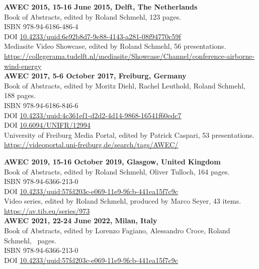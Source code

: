 \begin{multicols*}{2}
{\bfseries AWEC 2015, 15-16 June 2015, Delft, The Netherlands}\\
Book of Abstracts, edited by Roland Schmehl, 123 pages.\\
ISBN 978-94-6186-486-4\\
DOI \href{http://dx.doi.org/10.4233/uuid:6e92b8d7-9e88-4143-a281-08f94770c59f}{10.4233/uuid:6e92b8d7-9e88-4143-a281-08f94770c59f}\\[1mm]
Mediasite Video Showcase, edited by Roland Schmehl, 56 presentations.\\
\href{https://collegerama.tudelft.nl/mediasite/Showcase/Channel/conference-airborne-wind-energy}{https://collegerama.tudelft.nl/mediasite/Showcase/Channel/conference-airborne-wind-energy}\\[2mm]

{\bfseries AWEC 2017, 5-6 October 2017, Freiburg, Germany}\\
Book of Abstracts, edited by Moritz Diehl, Rachel Leuthold, Roland Schmehl, 188 pages.\\
ISBN 978-94-6186-846-6\\
DOI \href{http://dx.doi.org/10.4233/uuid:4c361ef1-d2d2-4d14-9868-16541f60edc7}{10.4233/uuid:4c361ef1-d2d2-4d14-9868-16541f60edc7}\\
DOI \href{http://dx.doi.org/10.6094/UNIFR/12994}{10.6094/UNIFR/12994}\\[1mm]
University of Freiburg Media Portal, edited by Patrick Caspari, 53 presentations.\\
\href{https://videoportal.uni-freiburg.de/search/tags/AWEC/}{https://videoportal.uni-freiburg.de/search/tags/AWEC/}

\vfill\null

\columnbreak

{\bfseries AWEC 2019, 15-16 October 2019, Glasgow, United Kingdom}\\
Book of Abstracts, edited by Roland Schmehl, Oliver Tulloch, 164 pages.\\
ISBN 978-94-6366-213-0\\
DOI \href{https://doi.org/10.4233/uuid:57fd203c-e069-11e9-9fcb-441ea15f7c9c}{10.4233/uuid:57fd203c-e069-11e9-9fcb-441ea15f7c9c}\\[1mm]
Video series, edited by Roland Schmehl, produced by Marco Seyer, 43 items.\\
\href{https://av.tib.eu/series/973}{https://av.tib.eu/series/973}\\[0mm]

{\bfseries AWEC 2021, 22-24 June 2022, Milan, Italy}\\
Book of Abstracts, edited by Lorenzo Fagiano, Alessandro Croce, Roland Schmehl, \thepage\, pages.\\
ISBN 978-94-6366-213-0\\
DOI \href{https://doi.org/10.4233/uuid:57fd203c-e069-11e9-9fcb-441ea15f7c9c}{10.4233/uuid:57fd203c-e069-11e9-9fcb-441ea15f7c9c}\\[-4mm]


\end{multicols*}
